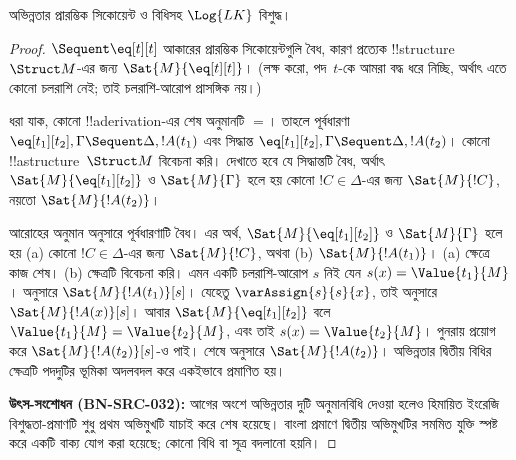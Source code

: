 \documentclass[../../../include/open-logic-section]{subfiles}
\begin{document}


\begin{prop}
অভিন্নতার প্রারম্ভিক সিকোয়েন্ট ও বিধিসহ $\Log{LK}$ বিশুদ্ধ।
\end{prop}

\begin{proof}
${} \Sequent \eq[t][t]$ আকারের প্রারম্ভিক সিকোয়েন্টগুলি বৈধ, কারণ
প্রত্যেক !!{structure}~$\Struct M$-এর জন্য $\Sat{M}{\eq[t][t]}$। (লক্ষ
করো, পদ~$t$-কে আমরা বদ্ধ ধরে নিচ্ছি, অর্থাৎ এতে কোনো চলরাশি নেই; তাই
চলরাশি-আরোপ প্রাসঙ্গিক নয়।)

ধরা যাক, কোনো !!a{derivation}-এর শেষ অনুমানটি $=$। তাহলে পূর্বধারণা
$\eq[t_1][t_2], \Gamma \Sequent \Delta, !A(t_1)$ এবং সিদ্ধান্ত
$\eq[t_1][t_2], \Gamma \Sequent \Delta, !A(t_2)$। কোনো
!!a{structure}~$\Struct M$ বিবেচনা করি। দেখাতে হবে যে সিদ্ধান্তটি
বৈধ, অর্থাৎ $\Sat{M}{\eq[t_1][t_2]}$ ও $\Sat{M}{\Gamma}$ হলে হয়
কোনো $!C \in \Delta$-এর জন্য $\Sat{M}{!C}$, নয়তো $\Sat{M}{!A(t_2)}$।

আরোহের অনুমান অনুসারে পূর্বধারণাটি বৈধ। এর অর্থ,
$\Sat{M}{\eq[t_1][t_2]}$ ও $\Sat{M}{\Gamma}$ হলে হয় (a) কোনো $!C
\in \Delta$-এর জন্য $\Sat{M}{!C}$, অথবা (b) $\Sat{M}{!A(t_1)}$।
(a) ক্ষেত্রে কাজ শেষ। (b) ক্ষেত্রটি বিবেচনা করি। এমন একটি চলরাশি-আরোপ
$s$ নিই যেন $s(x) = \Value{t_1}{M}$।
 অনুসারে
$\Sat{M}{!A(t_1)}[s]$। যেহেতু $\varAssign{s}{s}{x}$, তাই
 অনুসারে $\Sat{M}{!A(x)}[s]$। আবার
$\Sat{M}{\eq[t_1][t_2]}$ বলে $\Value{t_1}{M} = \Value{t_2}{M}$, এবং
তাই $s(x) = \Value{t_2}{M}$। পুনরায়
 প্রয়োগ করে
$\Sat{M}{!A(t_2)}[s]$-ও পাই। শেষে
 অনুসারে $\Sat{M}{!A(t_2)}$।
অভিন্নতার দ্বিতীয় বিধির ক্ষেত্রটি পদদুটির ভূমিকা অদলবদল করে একইভাবে
প্রমাণিত হয়।
\par\smallskip\noindent\textnormal{\small\textbf{উৎস-সংশোধন (BN-SRC-032):} আগের অংশে অভিন্নতার দুটি অনুমানবিধি দেওয়া হলেও হিমায়িত ইংরেজি বিশুদ্ধতা-প্রমাণটি শুধু প্রথম অভিমুখটি যাচাই করে শেষ হয়েছে। বাংলা প্রমাণে দ্বিতীয় অভিমুখটির সমমিত যুক্তি স্পষ্ট করে একটি বাক্য যোগ করা হয়েছে; কোনো বিধি বা সূত্র বদলানো হয়নি।} %
\end{proof}
\end{document}
